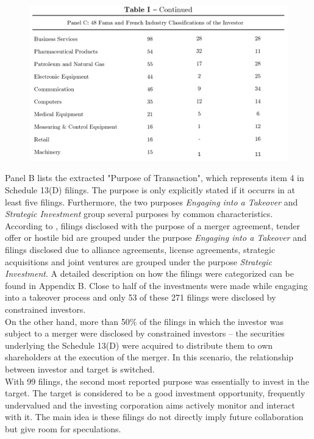 \documentclass[12pt]{article}
\begin{document}
\begin{figure}[!htb]
	\centering
	\begin{adjustbox}{width=\textwidth}
		\includegraphics{Descriptive}
	\end{adjustbox}
\end{figure}
\noindent Panel B lists the extracted "Purpose of Transaction", which represents item 4 in Schedule 13(D) filings. The purpose is only explicitly stated if it occurrs in at least five filings. Furthermore, the two purposes \emph{Engaging into a Takeover} and \emph{Strategic Investment} group several purposes by common characteristics. According to \citet[p.1]{Betton2008}, filings disclosed with the purpose of a merger agreement, tender offer or hostile bid are grouped under the purpose \emph{Engaging into a Takeover} and filings disclosed due to alliance agreements, license agreements, strategic acquisitions and joint ventures are grouped under the purpose \emph{Strategic Investment}. A detailed description on how the filings were categorized can be found in Appendix B. 
Close to half of the investments were made while engaging into a takeover process and only 53 of these 271 filings were disclosed by constrained investors.\\
On the other hand, more than 50\% of the filings in which the investor was subject to a merger were disclosed by constrained investors -- the securities underlying the Schedule 13(D) were acquired to distribute them to own shareholders at the execution of the merger. In this scenario, the relationship between investor and target is switched.\\
With 99 filings, the second most reported purpose was essentially to invest in the target. The target is considered to be a good investment opportunity, frequently undervalued and the investing corporation aims actively monitor and interact with it. The main idea is these filings do not directly imply future collaboration but give room for speculations.\\
\end{document}
